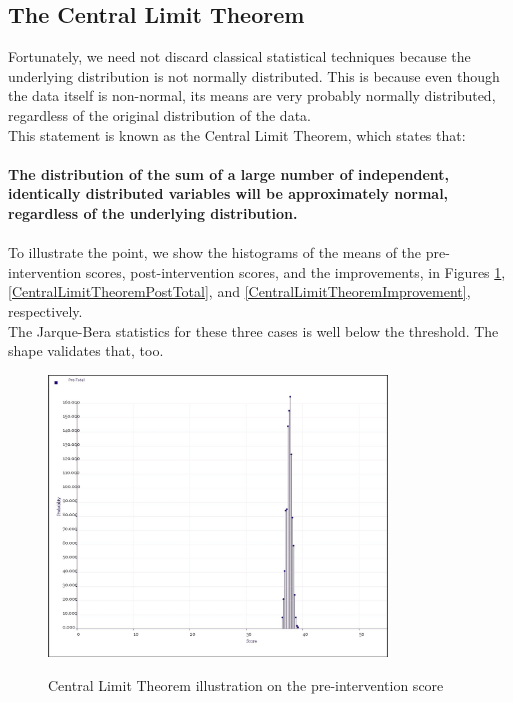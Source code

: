 \documentclass[10pt]{article}
\begin{document}
\subsection{The Central Limit Theorem}
\label{ref:CentralLimitTheorem}
Fortunately, we need not discard classical statistical techniques because the underlying distribution is not normally distributed. This is because even though the data itself is non-normal, its means are very probably normally distributed, regardless of the original distribution of the data.\\
This statement is known as the Central Limit Theorem, which states that:\\\\
\textbf{The distribution of the sum of a large number of independent, identically distributed variables will be approximately normal, regardless of the underlying distribution.}\\\\
To illustrate the point, we show the histograms of the means of the pre-intervention scores, post-intervention scores, and the improvements, in Figures \ref{CentralLimitTheoremPreTotal}, \ref{CentralLimitTheoremPostTotal}, and \ref{CentralLimitTheoremImprovement}, respectively.\\
The Jarque-Bera statistics for these three cases is well below the threshold. The shape validates that, too.
\begin{figure}
\caption{Central Limit Theorem illustration on the pre-intervention score}
\label{CentralLimitTheoremPreTotal}
\begin{center}
\includegraphics[width=90mm]{ReportMedia/CentralLimitTheoremPreTotal.jpg}\\
\end{center}
\end{figure}
\end{document}
